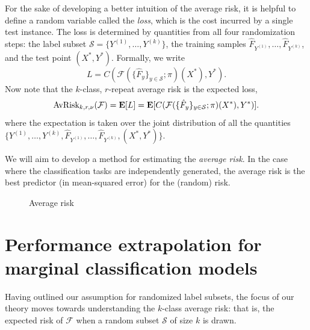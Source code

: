 \documentclass[12pt]{article}
\begin{document}
For the sake of developing a better intuition of the average risk, it
is helpful to define a random variable called the \emph{loss}, which
is the cost incurred by a single test instance.  The loss is
determined by quantities from all four randomization steps: the label
subset $\mathcal{S} = \{Y^{(1)},\hdots, Y^{(k)}\}$, the training samples
$\hat{F}_{Y^{(1)}},\hdots, \hat{F}_{Y^{(k)}}$, and the test point $(X^*, Y^*)$.
Formally, we write
\[
L = C(\mathcal{F}(\{\hat{F}_y\}_{y \in \mathcal{S}}; \pi)(X^*), Y^*).
\]
Now note that the $k$-class, $r$-repeat average risk is the expected loss,
\begin{equation}\label{eq:avrisk_EL}
\text{AvRisk}_{k, r, \nu}(\mathcal{F}) = \textbf{E}[L] = \textbf{E}[C(\mathcal{F}(\{\hat{F}_y\}_{y \in \mathcal{S}}; \pi)(X^*), Y^*)].
\end{equation}
where the expectation is taken over the joint distribution of all the
quantities $\{Y^{(1)},\hdots,
Y^{(k)}, \hat{F}_{Y^{(1)}},\hdots, \hat{F}_{Y^{(k)}}, (X^*, Y^*)\}$.

We will aim to develop a method for estimating the \emph{average
risk}.  In the case where the classification tasks are independently
generated, the average risk is the best predictor (in mean-squared
error) for the (random) risk.


\begin{figure}[h]
\centering
\caption{Average risk}\label{fig:average_risk}
\end{figure}




\section{Performance extrapolation for marginal classification models}

Having outlined our assumption for randomized label subsets, the focus
of our theory moves towards understanding the $k$-class average risk:
that is, the expected risk of $\mathcal{F}$ when a random subset
$\mathcal{S}$ of size $k$ is drawn.
\end{document}
